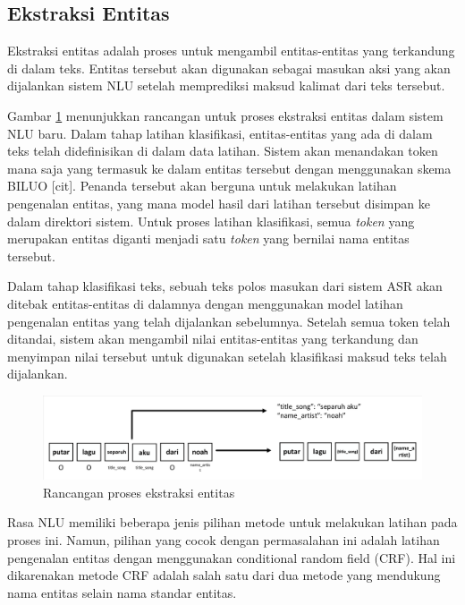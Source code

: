 \subsection{Ekstraksi Entitas}

Ekstraksi entitas adalah proses untuk mengambil entitas-entitas yang terkandung di dalam teks. Entitas tersebut akan digunakan sebagai masukan aksi yang akan dijalankan sistem NLU setelah memprediksi maksud kalimat dari teks tersebut.

Gambar \ref{fig:design_entity} menunjukkan rancangan untuk proses ekstraksi entitas dalam sistem NLU baru. Dalam tahap latihan klasifikasi, entitas-entitas yang ada di dalam teks telah didefinisikan di dalam data latihan. Sistem akan menandakan token mana saja yang termasuk ke dalam entitas tersebut dengan menggunakan skema BILUO [cit]. Penanda tersebut akan berguna untuk melakukan latihan pengenalan entitas, yang mana model hasil dari latihan tersebut disimpan ke dalam direktori sistem. Untuk proses latihan klasifikasi, semua \textit{token} yang merupakan entitas diganti menjadi satu \textit{token} yang bernilai nama entitas tersebut.

Dalam tahap klasifikasi teks, sebuah teks polos masukan dari sistem ASR akan ditebak entitas-entitas di dalamnya dengan menggunakan model latihan pengenalan entitas yang telah dijalankan sebelumnya. Setelah semua token telah ditandai, sistem akan mengambil nilai entitas-entitas yang terkandung dan menyimpan nilai tersebut untuk digunakan setelah klasifikasi maksud teks telah dijalankan.

\begin{figure}[H]
	\centering
	\includegraphics[width=\textwidth, trim=2 2 2 2, clip]{resources/4-design_entity.pdf}
	\caption{Rancangan proses ekstraksi entitas}
	\label{fig:design_entity}
\end{figure}

Rasa NLU memiliki beberapa jenis pilihan metode untuk melakukan latihan pada proses ini. Namun, pilihan yang cocok dengan permasalahan ini adalah latihan pengenalan entitas dengan menggunakan conditional random field (CRF). Hal ini dikarenakan metode CRF adalah salah satu dari dua metode yang mendukung nama entitas selain nama standar entitas.

